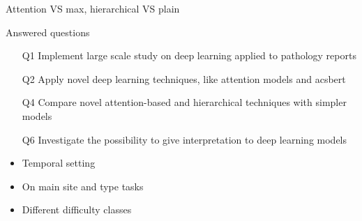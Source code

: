 \begin{frame}{Attention VS max, hierarchical VS plain}
  \begin{block}{Answered questions}
  \begin{itemize}
  \item[Q1] Implement \alert{large scale} study on deep learning
    applied to pathology reports
  \item[Q2] Apply \alert{novel} deep learning techniques, like
    \alert{attention} models and \alert{acs{bert}}
  \item[Q4] \alert{Compare} novel \alert{attention}-based and
    \alert{hierarchical} techniques with simpler models
  \item[Q6] \alert{Investigate} the possibility to give
    \alert{interpretation} to deep learning models
  \end{itemize}
\end{block}
\begin{itemize}
\item \alert{Temporal} setting
\item On \alert{main site} and \alert{type} tasks
\item Different \alert{difficulty} classes
\end{itemize}
\end{frame}

